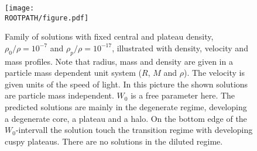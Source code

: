 \begin{figure}%
	\centering%
	\texttt{[image: \\ROOTPATH/figure.pdf]}
	\caption{Family of solutions with fixed central and plateau density, $\rho_0/\rho = 10^{-7}$ and $\rho_p/\rho = 10^{-17}$, illustrated with density, velocity and mass profiles. Note that radius, mass and density are given in a particle mass dependent unit system ($R$, $M$ and $\rho$). The velocity is given units of the speed of light. In this picture the shown solutions are particle mass independent. $W_0$ is a free parameter here. The predicted solutions are mainly in the degenerate regime, developing a degenerate core, a plateau and a halo. On the bottom edge of the $W_0$-intervall the solution touch the transition regime with developing cuspy plateaus. There are no solutions in the diluted regime.}%
	\label{fig:profiles:without-cutoff:RHO0RHOp:raw}%
\end{figure}